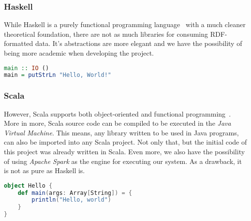 \subsubsection{Haskell}

While Haskell is a purely functional programming language~\cite{wiki:Haskell} with a much cleaner theoretical foundation, there are not as much libraries for consuming RDF-formatted data. It's abstractions are more elegant and we have the possibility of being more academic when developing the project.

\begin{lstlisting}[language=Haskell, caption=\textit{Hello World!} program written in Haskell]
main :: IO ()
main = putStrLn "Hello, World!"
\end{lstlisting}

\subsubsection{Scala}

However, Scala supports both object-oriented and functional programming~\cite{wiki:Scala_(programming_language)}. More in more, Scala source code can be compiled to be executed in the \textit{Java Virtual Machine}. This means, any library written to be used in Java programs, can also be imported into any Scala project. Not only that, but the initial code of this project was already written in Scala. Even more, we also have the possibility of using \textit{Apache Spark} as the engine for executing our system. As a drawback, it is not as pure as Haskell is.

\begin{lstlisting}[language=Scala, caption=\textit{Hello World!} program written in Scala 2]
object Hello {
    def main(args: Array[String]) = {
        println("Hello, world")
    }
}
\end{lstlisting}